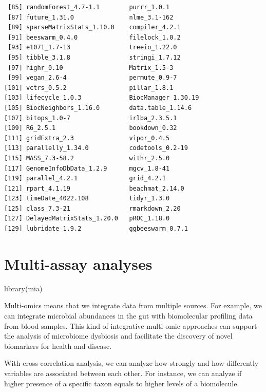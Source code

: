 \documentclass[
]{book}
\newenvironment{Shaded}{\begin{snugshade}}{\end{snugshade}}
\newcommand{\FunctionTok}[1]{\textcolor[rgb]{0.00,0.00,0.00}{#1}}
\newcommand{\NormalTok}[1]{#1}
\begin{document}
\begin{verbatim}
 [85] randomForest_4.7-1.1        purrr_1.0.1                
 [87] future_1.31.0               nlme_3.1-162               
 [89] sparseMatrixStats_1.10.0    compiler_4.2.1             
 [91] beeswarm_0.4.0              filelock_1.0.2             
 [93] e1071_1.7-13                treeio_1.22.0              
 [95] tibble_3.1.8                stringi_1.7.12             
 [97] highr_0.10                  Matrix_1.5-3               
 [99] vegan_2.6-4                 permute_0.9-7              
[101] vctrs_0.5.2                 pillar_1.8.1               
[103] lifecycle_1.0.3             BiocManager_1.30.19        
[105] BiocNeighbors_1.16.0        data.table_1.14.6          
[107] bitops_1.0-7                irlba_2.3.5.1              
[109] R6_2.5.1                    bookdown_0.32              
[111] gridExtra_2.3               vipor_0.4.5                
[113] parallelly_1.34.0           codetools_0.2-19           
[115] MASS_7.3-58.2               withr_2.5.0                
[117] GenomeInfoDbData_1.2.9      mgcv_1.8-41                
[119] parallel_4.2.1              grid_4.2.1                 
[121] rpart_4.1.19                beachmat_2.14.0            
[123] timeDate_4022.108           tidyr_1.3.0                
[125] class_7.3-21                rmarkdown_2.20             
[127] DelayedMatrixStats_1.20.0   pROC_1.18.0                
[129] lubridate_1.9.2             ggbeeswarm_0.7.1           
\end{verbatim}

\hypertarget{multi-assay-analyses}{%
\chapter{Multi-assay analyses}\label{multi-assay-analyses}}

\begin{Shaded}
\begin{Highlighting}[]
\FunctionTok{library}\NormalTok{(mia)}
\end{Highlighting}
\end{Shaded}

Multi-omics means that we integrate data from multiple sources. For example,
we can integrate microbial abundances in the gut with biomolecular profiling data
from blood samples. This kind of integrative multi-omic approaches can support the
analysis of microbiome dysbiosis and facilitate the discovery of novel biomarkers
for health and disease.

With cross-correlation analysis, we can analyze how strongly and how differently
variables are associated between each other. For instance, we can analyze if
higher presence of a specific taxon equals to higher levels of a biomolecule.
\end{document}
